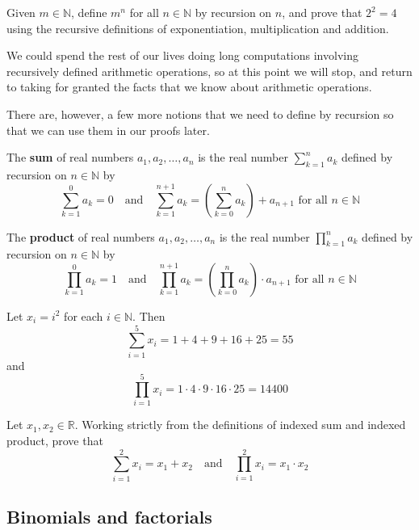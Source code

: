 \begin{exercise}
Given $m \in \mathbb{N}$, define $m^n$ for all $n \in \mathbb{N}$ by recursion on $n$, and prove that $2^2 = 4$ using the recursive definitions of exponentiation, multiplication and addition.
\end{exercise}

We could spend the rest of our lives doing long computations involving recursively defined arithmetic operations, so at this point we will stop, and return to taking for granted the facts that we know about arithmetic operations.

There are, however, a few more notions that we need to define by recursion so that we can use them in our proofs later.

\begin{definition}
\label{defSumOfRealNumbers}
The \textbf{sum} of real numbers $a_1, a_2, \dots, a_n$ is the real number $\sum_{k=1}^n a_k$ defined by recursion on $n \in \mathbb{N}$ by
\[ \sum_{k=1}^0 a_k = 0 \quad \text{and} \quad \sum_{k=1}^{n+1} a_k = \left( \sum_{k=0}^n a_k \right) + a_{n+1} \text{ for all } n \in \mathbb{N} \]
\end{definition}

\begin{definition}
\label{defProductOfRealNumbers}
The \textbf{product} of real numbers $a_1, a_2, \dots, a_n$ is the real number $\prod_{k=1}^n a_k$ defined by recursion on $n \in \mathbb{N}$ by
\[ \prod_{k=1}^0 a_k = 1 \quad \text{and} \quad \prod_{k=1}^{n+1} a_k = \left( \prod_{k=0}^n a_k \right) \cdot a_{n+1} \text{ for all } n \in \mathbb{N} \]
\end{definition}

\begin{example}
Let $x_i=i^2$ for each $i \in \mathbb{N}$. Then
\[ \sum_{i=1}^5 x_i = 1 + 4 + 9 + 16 + 25 = 55 \]
and
\[ \prod_{i=1}^5 x_i = 1 \cdot 4 \cdot 9 \cdot 16 \cdot 25 = 14400 \]
\end{example}

\begin{exercise}
Let $x_1, x_2 \in \mathbb{R}$. Working strictly from the definitions of indexed sum and indexed product, prove that
\[ \sum_{i=1}^2 x_i = x_1 + x_2 \quad \text{and} \quad \prod_{i=1}^2 x_i = x_1 \cdot x_2 \]
\end{exercise}

\subsection*{Binomials and factorials}

